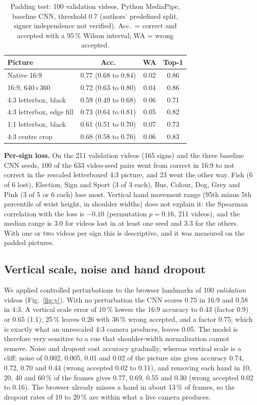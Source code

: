 \documentclass[conference]{IEEEtran}
\begin{document}
\begin{table}[t]
\caption{Padding test: 100 validation videos, Python MediaPipe, baseline CNN, threshold 0.7 (authors' predefined split, signer independence not verified). Acc.\ = correct and accepted with a 95\,\% Wilson interval; WA = wrong accepted.}
\label{tab:pad}
\centering
\small
\setlength{\tabcolsep}{2.5pt}
\begin{tabular}{lccc}
\hline
Picture & Acc. & WA & Top-1\\
\hline
Native 16:9 & 0.77 (0.68 to 0.84) & 0.02 & 0.86\\
16:9, 640$\times$360 & 0.72 (0.63 to 0.80) & 0.04 & 0.86\\
4:3 letterbox, black & 0.59 (0.49 to 0.68) & 0.06 & 0.71\\
4:3 letterbox, edge fill & 0.73 (0.64 to 0.81) & 0.05 & 0.82\\
1:1 letterbox, black & 0.61 (0.51 to 0.70) & 0.07 & 0.73\\
4:3 centre crop & 0.68 (0.58 to 0.76) & 0.06 & 0.83\\
\hline
\end{tabular}
\end{table}

\textbf{Per-sign loss.} On the 211 validation videos (165 signs) and the three baseline CNN seeds, 100 of the 633 video-seed pairs went from correct in 16:9 to not correct in the rescaled letterboxed 4:3 picture, and 23 went the other way. Fish (6 of 6 lost), Election, Sign and Sport (3 of 3 each), Bus, Colour, Dog, Grey and Pink (3 of 5 or 6 each) lose most. Vertical hand movement range (95th minus 5th percentile of wrist height, in shoulder widths) does not explain it: the Spearman correlation with the loss is $-0.10$ (permutation $p=0.16$, 211 videos), and the median range is 3.0 for videos lost in at least one seed and 3.3 for the others. With one or two videos per sign this is descriptive, and it was measured on the padded pictures.

\subsection{Vertical scale, noise and hand dropout}
We applied controlled perturbations to the browser landmarks of 100 \emph{validation} videos (Fig.~\ref{fig:y}). With no perturbation the CNN scores 0.75 in 16:9 and 0.58 in 4:3. A vertical scale error of 10\,\% lowers the 16:9 accuracy to 0.43 (factor 0.9) or 0.65 (1.1); 25\,\% leaves 0.26 with 36\,\% wrong accepted, and a factor 0.75, which is exactly what an unrescaled 4:3 camera produces, leaves 0.05. The model is therefore very sensitive to a cue that shoulder-width normalization cannot remove. Noise and dropout cost accuracy gradually, whereas vertical scale is a cliff: noise of 0.002, 0.005, 0.01 and 0.02 of the picture size gives accuracy 0.74, 0.72, 0.70 and 0.44 (wrong accepted 0.02 to 0.11), and removing each hand in 10, 20, 40 and 60\,\% of the frames gives 0.77, 0.69, 0.55 and 0.30 (wrong accepted 0.02 to 0.16). The browser already misses a hand in about 13\,\% of frames, so the dropout rates of 10 to 20\,\% are within what a live camera produces.
\end{document}

